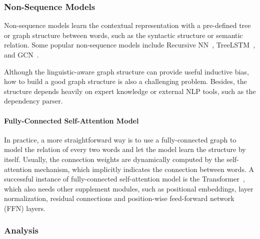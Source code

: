 \documentclass[fleqn]{SCYE-arxiv}
\begin{document}
\begin{multicols}{2}


\subsubsection{Non-Sequence Models}

Non-sequence models learn the contextual representation with a pre-defined tree or graph structure between words, such as the syntactic structure or semantic relation. Some popular non-sequence models include Recursive NN~\cite{socher2013recursive}, TreeLSTM~\cite{tai2015improved,zhu2015long}, and GCN~\cite{kipf2017semi}.

Although the linguistic-aware graph structure can provide useful inductive bias, how to build a good graph structure is also a challenging problem. Besides, the structure depends heavily on expert knowledge or external NLP tools, such as the dependency parser.

\paragraph{Fully-Connected Self-Attention Model}
In practice, a more straightforward way is to use a fully-connected graph to model the relation of every two words and let the model learn the structure by itself. Usually, the connection weights are dynamically computed by the self-attention mechanism, which implicitly indicates the connection between words.
A successful instance of fully-connected self-attention model is the Transformer~\cite{vaswani2017transformer,lin2021survey}, which also needs other supplement modules, such as positional embeddings, layer normalization, residual connections and position-wise feed-forward network (FFN) layers.



\subsubsection{Analysis}


\end{multicols}
\end{document}
